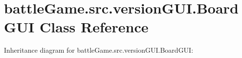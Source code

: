 \hypertarget{classbattleGame_1_1src_1_1versionGUI_1_1BoardGUI}{}\section{battle\+Game.\+src.\+version\+G\+U\+I.\+Board\+G\+UI Class Reference}
\label{classbattleGame_1_1src_1_1versionGUI_1_1BoardGUI}


Inheritance diagram for battle\+Game.\+src.\+version\+G\+U\+I.\+Board\+G\+UI\+:
